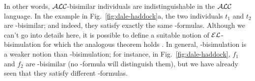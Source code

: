 In other words, $\mathcal{ALC}$-bisimilar individuals are indistinguishable in
the $\mathcal{ALC}$ language.  In the example in Fig.~\ref{fig:dale-haddock}a,
the two individuals $t_1$ and $t_2$ are \alc-bisimilar; and indeed,
they satisfy exactly the same \alc-formulas.  Although we can't go
into details here, it is possible to define a suitable notion of
$\mathcal{EL}$-bisimulation for which the analogous theorem holds
\cite{kurt:expr99}.  In general, \el-bisimulation is a weaker notion
than \alc-bisimulation; for instance, in Fig.~\ref{fig:dale-haddock},
$f_1$ and $f_2$ are \el-bisimilar  (no \el-formula will
distinguish them), but we have already seen that they satisfy
different \alc-formulas.

